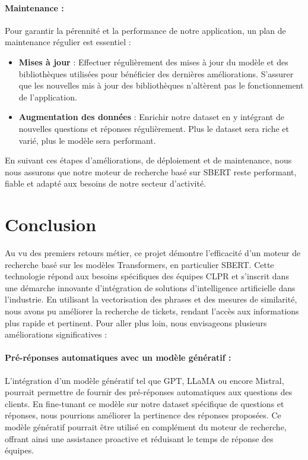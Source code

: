 \documentclass[12pt]{article}
\theoremstyle{definition}
\begin{document}
\paragraph{Maintenance :}

Pour garantir la pérennité et la performance de notre application, un plan de maintenance régulier est essentiel :

\begin{itemize}
	\item \textbf{Mises à jour} : Effectuer régulièrement des mises à jour du modèle et des bibliothèques utilisées pour bénéficier des dernières améliorations. S'assurer que les nouvelles mis à jour des bibliothèques n'altèrent pas le fonctionnement de l'application.    
	\item \textbf{Augmentation des données} : Enrichir notre dataset en y intégrant de nouvelles questions et réponses régulièrement. Plus le dataset sera riche et varié, plus le modèle sera performant.
\end{itemize}

En suivant ces étapes d'améliorations, de déploiement et de maintenance, nous nous assurons que notre moteur de recherche basé sur SBERT reste performant, fiable et adapté aux besoins de notre secteur d'activité.

\section{Conclusion}

Au vu des premiers retours métier, ce projet démontre l'efficacité d'un moteur de recherche basé sur les modèles Transformers, en particulier SBERT. Cette technologie répond aux besoins spécifiques des équipes CLPR et s'inscrit dans une démarche innovante d'intégration de solutions d'intelligence artificielle dans l'industrie. En utilisant la vectorisation des phrases et des mesures de similarité, nous avons pu améliorer la recherche de tickets, rendant l'accès aux informations plus rapide et pertinent. Pour aller plus loin, nous envisageons plusieurs améliorations significatives :

\paragraph{Pré-réponses automatiques avec un modèle génératif : }
L'intégration d'un modèle génératif tel que GPT, LLaMA ou encore Mistral, pourrait permettre de fournir des pré-réponses automatiques aux questions des clients. En fine-tunant ce modèle sur notre dataset spécifique de questions et réponses, nous pourrions améliorer la pertinence des réponses proposées. Ce modèle génératif pourrait être utilisé en complément du moteur de recherche, offrant ainsi une assistance proactive et réduisant le temps de réponse des équipes.
\end{document}
